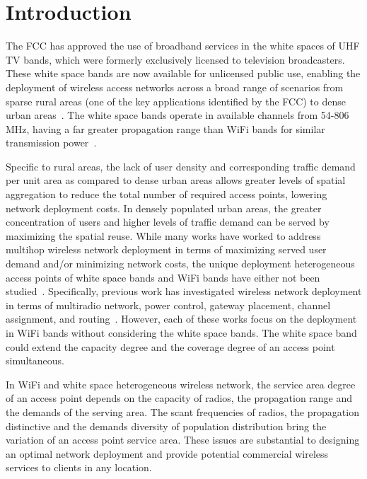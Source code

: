 \section{Introduction}
\label{sec:introduction}



The FCC has approved the use of broadband services in the white spaces of 
UHF TV bands, which were formerly exclusively licensed to television broadcasters.
These white space bands are now available for unlicensed public use, enabling the
deployment of wireless access networks across a broad range of scenarios from 
sparse rural areas (one of the key applications identified by the FCC) to dense urban 
areas~\cite{carlson}. The white space bands operate in available channels from 
54-806 MHz, having a far greater propagation range than WiFi bands for similar
transmission power~\cite{balanis2012antenna}. 

Specific to rural areas, the lack of user density and corresponding traffic
demand per unit area as compared to dense urban areas allows greater levels of
spatial aggregation to reduce the total number of required access points, lowering
network deployment costs. In densely populated urban areas, the greater concentration
of users and higher levels of traffic demand can be served by maximizing the spatial
reuse. While many works have worked to address multihop wireless network deployment
in terms of maximizing served user demand and/or minimizing network costs,
the unique deployment heterogeneous access points of white space bands and 
WiFi bands have either not been studied~\cite{si2010overview}. 
Specifically, previous work has investigated wireless network deployment in terms of 
multiradio network, power control, gateway placement, channel assignment, 
and routing~\cite{kodialam2005characterizing,he2008optimizing,marina2010topology}.
However, each of these works focus on the deployment in WiFi bands without
considering the white space bands. The white space band could extend the capacity 
degree and the coverage degree of an access point simultaneous. 

In WiFi and white space heterogeneous wireless network, the service area degree of 
an access point depends on the capacity of radios, the propagation range and the 
demands of the serving area. The scant frequencies of radios, the propagation distinctive
and the demands diversity of population distribution bring the variation of an access point
service area. These issues are substantial to designing an optimal network deployment 
and provide potential commercial wireless services to clients in any location.

